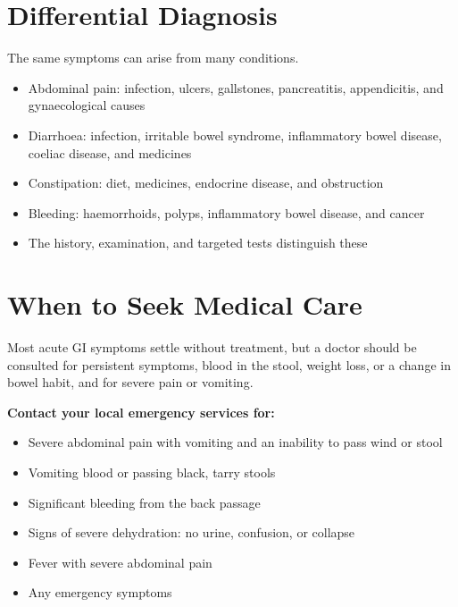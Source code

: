 \section*{Differential Diagnosis}
The same symptoms can arise from many conditions.
\begin{itemize}
    \item Abdominal pain: infection, ulcers, gallstones, pancreatitis, appendicitis, and gynaecological causes
    \item Diarrhoea: infection, irritable bowel syndrome, inflammatory bowel disease, coeliac disease, and medicines
    \item Constipation: diet, medicines, endocrine disease, and obstruction
    \item Bleeding: haemorrhoids, polyps, inflammatory bowel disease, and cancer
    \item The history, examination, and targeted tests distinguish these
\end{itemize}

\section*{When to Seek Medical Care}
Most acute GI symptoms settle without treatment, but a doctor should be consulted for persistent symptoms, blood in the stool, weight loss, or a change in bowel habit, and for severe pain or vomiting.

\textbf{Contact your local emergency services for:}
\begin{itemize}
    \item Severe abdominal pain with vomiting and an inability to pass wind or stool
    \item Vomiting blood or passing black, tarry stools
    \item Significant bleeding from the back passage
    \item Signs of severe dehydration: no urine, confusion, or collapse
    \item Fever with severe abdominal pain
    \item Any emergency symptoms
\end{itemize}

